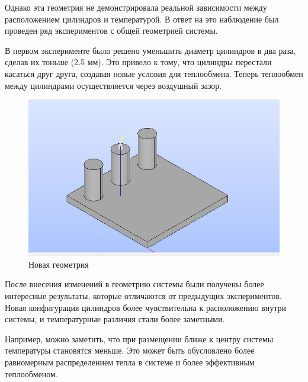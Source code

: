 \documentclass[a4paper,12pt]{extreport}
\numberwithin{equation}{chapter}
\begin{document}
Однако эта геометрия не демонстрировала реальной зависимости между расположением цилиндров и температурой. В ответ на это наблюдение был проведен ряд экспериментов с общей геометрией системы.

В первом эксперименте было решено уменьшить диаметр цилиндров в два раза, сделав их тоньше (2.5 мм). Это привело к тому, что цилиндры перестали касаться друг друга, создавая новые условия для теплообмена. Теперь теплообмен между цилиндрами осуществляется через воздушный зазор.

\begin{figure}[h]
	\begin{center}
		\includegraphics[width=0.4\linewidth]{images/20.jpg}
		\caption{Новая геометрия} %
	\end{center}
\end{figure}

После внесения изменений в геометрию системы были получены более интересные результаты, которые отличаются от предыдущих экспериментов. Новая конфигурация цилиндров более чувствительна к расположению внутри системы, и температурные различия стали более заметными.

Например, можно заметить, что при размещении ближе к центру системы температуры становятся меньше. Это может быть обусловлено более равномерным распределением тепла в системе и более эффективным теплообменом.
\end{document}
